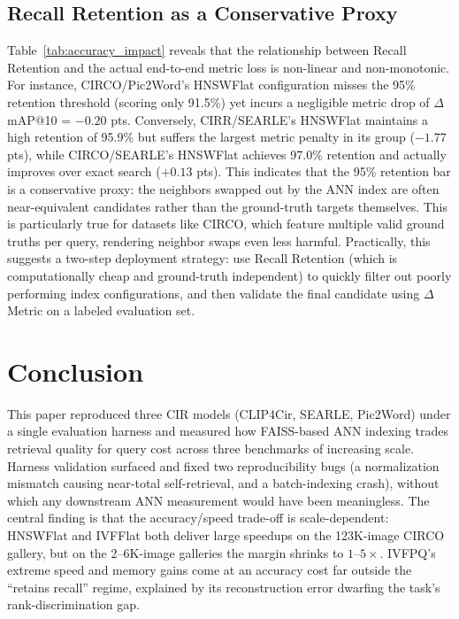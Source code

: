 \documentclass[conference]{IEEEtran}
\begin{document}
\subsection{Recall Retention as a Conservative Proxy}
Table~\ref{tab:accuracy_impact} reveals that the relationship between Recall Retention and the actual end-to-end metric loss is non-linear and non-monotonic. For instance, CIRCO/Pic2Word's HNSWFlat configuration misses the 95\% retention threshold (scoring only 91.5\%) yet incurs a negligible metric drop of $\Delta$mAP@10 = $-0.20$ pts. Conversely, CIRR/SEARLE's HNSWFlat maintains a high retention of 95.9\% but suffers the largest metric penalty in its group ($-1.77$ pts), while CIRCO/SEARLE's HNSWFlat achieves 97.0\% retention and actually improves over exact search ($+0.13$ pts). This indicates that the 95\% retention bar is a conservative proxy: the neighbors swapped out by the ANN index are often near-equivalent candidates rather than the ground-truth targets themselves. This is particularly true for datasets like CIRCO, which feature multiple valid ground truths per query, rendering neighbor swaps even less harmful. Practically, this suggests a two-step deployment strategy: use Recall Retention (which is computationally cheap and ground-truth independent) to quickly filter out poorly performing index configurations, and then validate the final candidate using $\Delta$Metric on a labeled evaluation set.

\section{Conclusion}
\label{sec:conclusion}

This paper reproduced three CIR models (CLIP4Cir, SEARLE, Pic2Word) under a single evaluation harness and measured how FAISS-based ANN indexing trades retrieval quality for query cost across three benchmarks of increasing scale. Harness validation surfaced and fixed two reproducibility bugs (a normalization mismatch causing near-total self-retrieval, and a batch-indexing crash), without which any downstream ANN measurement would have been meaningless. The central finding is that the accuracy/speed trade-off is scale-dependent: HNSWFlat and IVFFlat both deliver large speedups on the 123K-image CIRCO gallery, but on the 2--6K-image galleries the margin shrinks to $1$--$5\times$. IVFPQ's extreme speed and memory gains come at an accuracy cost far outside the ``retains recall'' regime, explained by its reconstruction error dwarfing the task's rank-discrimination gap.
\end{document}
